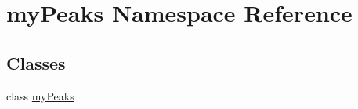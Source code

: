 \hypertarget{namespacemy_peaks}{\section{my\-Peaks Namespace Reference}
\label{namespacemy_peaks}
}
\subsection*{Classes}
\begin{DoxyCompactItemize}
\item 
class \hyperlink{classmy_peaks_1_1my_peaks}{my\-Peaks}
\end{DoxyCompactItemize}
